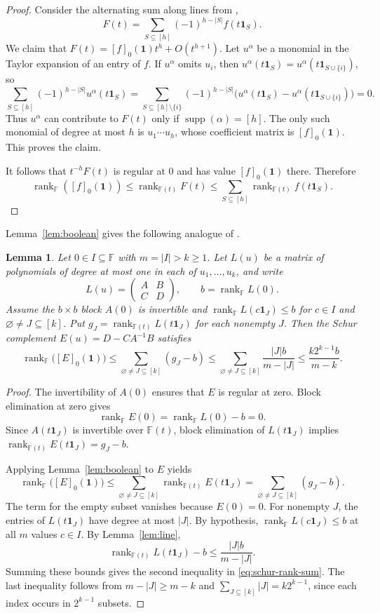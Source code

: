 \documentclass[11pt,reqno]{amsart}
\theoremstyle{plain}
\newtheorem{lemma}[theorem]{Lemma}
\theoremstyle{definition}
\newcommand{\F}{\mathbb F}
\DeclareMathOperator{\rk}{rank}
\begin{document}
\begin{proof}
Consider the alternating sum along lines from \cite[Lemma~3.5]{MZSchur},
\[
 F(t)=\sum_{S\subseteq[h]}(-1)^{h-|S|}f(t\mathbf 1_S).
\]
We claim that $F(t)=[f]_0(\mathbf 1)t^h+O(t^{h+1})$. Let $u^{\alpha}$ be a monomial in the Taylor expansion of an entry of $f$. If $u^{\alpha}$ omits $u_i$, then $u^{\alpha}(t\mathbf 1_S)=u^{\alpha}(t\mathbf 1_{S\cup\{i\}})$, so
\[
 \sum_{S\subseteq[h]}(-1)^{h-|S|}u^{\alpha}(t\mathbf 1_S)
 =\sum_{S\subseteq[h]\setminus\{i\}}(-1)^{h-|S|}
 \bigl(u^{\alpha}(t\mathbf 1_S)-u^{\alpha}(t\mathbf 1_{S\cup\{i\}})\bigr)=0.
\]
Thus $u^{\alpha}$ can contribute to $F(t)$ only if $\operatorname{supp}(\alpha)=[h]$. The only such monomial of degree at most $h$ is $u_1\cdots u_h$, whose coefficient matrix is $[f]_0(\mathbf 1)$. This proves the claim.

It follows that $t^{-h}F(t)$ is regular at $0$ and has value $[f]_0(\mathbf 1)$ there. Therefore
\[
 \rk_{\F}([f]_0(\mathbf 1))\leq\rk_{\F(t)}F(t)
 \leq\sum_{S\subseteq[h]}\rk_{\F(t)}f(t\mathbf 1_S).
\]
\end{proof}
Lemma~\ref{lem:boolean} gives the following analogue of \cite[Proposition~4.5]{MZSchur}.
\begin{lemma}\label{lem:schur-coefficient}
Let $0\in I\subseteq\F$ with $m=|I|>k\geq1$. Let $L(u)$ be a matrix
of polynomials of degree at most one in each of $u_1,\ldots,u_k$, and write
\[
 L(u)=\begin{pmatrix}A&B\\ C&D\end{pmatrix},\qquad b=\rk_{\F}L(0).
\]
Assume the $b\times b$ block $A(0)$ is invertible and
$\rk_{\F}L(c\mathbf 1_J)\leq b$ for $c\in I$ and
$\varnothing\ne J\subseteq[k]$.  Put $g_J=\rk_{\F(t)}L(t\mathbf 1_J)$ for each
nonempty $J$. Then the Schur complement $E(u)=D-CA^{-1}B$ satisfies
\begin{equation}\label{eq:schur-rank-sum}
 \rk_{\F}\bigl([E]_0(\mathbf 1)\bigr)
 \leq\sum_{\varnothing\ne J\subseteq[k]}(g_J-b)
 \leq\sum_{\varnothing\ne J\subseteq[k]}\frac{|J|b}{m-|J|}
 \leq\frac{k2^{k-1}b}{m-k}.
\end{equation}
\end{lemma}
\begin{proof}
The invertibility of $A(0)$ ensures that $E$ is regular at zero. Block elimination at zero gives
\[
 \rk_{\F}E(0)=\rk_{\F}L(0)-b=0.
\] Since $A(t\mathbf 1_J)$ is invertible over $\F(t)$, block
elimination of $L(t \mathbf 1_J)$ implies
$\rk_{\F(t)}E(t\mathbf 1_J)=g_J-b$. 

Applying
Lemma~\ref{lem:boolean} to $E$ yields
\[
 \rk_{\F}\bigl([E]_0(\mathbf 1)\bigr)
 \leq \sum_{\varnothing\ne J\subseteq[k]}\rk_{\F(t)}E(t\mathbf 1_J)
 =\sum_{\varnothing\ne J\subseteq[k]}(g_J-b).
\]
The term for the empty subset vanishes because $E(0)=0$.
For nonempty $J$, the entries of $L(t\mathbf 1_J)$ have degree at most
$|J|$. By hypothesis,
$\rk_{\F}L(c\mathbf 1_J)\leq b$ at all $m$ values $c\in I$.
By Lemma~\ref{lem:line},
\[
 \rk_{\F(t)} L(t\mathbf 1_J)-b\leq\frac{|J|b}{m-|J|}.
\]
Summing these bounds gives the second inequality in \eqref{eq:schur-rank-sum}.
The last inequality follows from $m-|J|\geq m-k$ and $\sum_{J\subseteq[k]}|J|=k2^{k-1}$,
since each index occurs in $2^{k-1}$ subsets.
\end{proof}
\end{document}
